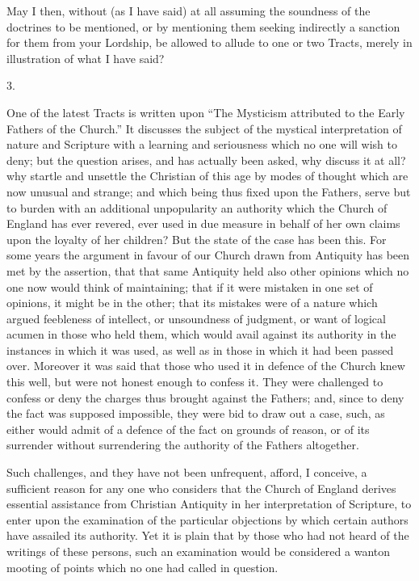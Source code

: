 May I then, without (as I have said) at all
assuming the soundness of the doctrines to be mentioned, or by
mentioning them seeking indirectly a sanction for them from your
Lordship, be allowed to allude to one or two Tracts, merely in
illustration of what I have said?

3.

One of the latest Tracts is written upon ``The
Mysticism attributed to the Early Fathers of the Church.'' It discusses
the subject of the mystical interpretation of nature and Scripture
with a learning and seriousness which no one will wish to deny; but
the question arises, and has actually been asked, why discuss it at
all? why startle and unsettle the Christian of this age by modes of
thought which are now unusual and strange; and which being thus fixed
upon the Fathers, serve but to burden with an additional unpopularity
an authority which the Church of England has ever revered, ever used
in due measure in behalf of her own claims upon the loyalty of her
children? But the state of the case has been this. For some years the
argument in favour of our Church drawn from Antiquity has been met by
the assertion, that that same Antiquity held also other opinions which
no one now would think of maintaining; that if it were mistaken in one
set of opinions, it might be in the other; that its mistakes were of a
nature which argued feebleness of intellect, or unsoundness of
judgment, or want of logical acumen in those who held them, which
would avail against its authority in the instances in which it was
used, as well as in those in which it had been passed over. Moreover
it was said that those who used it in defence of the Church knew this
well, but were not honest enough to confess it. They were challenged
to confess or deny the charges thus brought against the Fathers; and,
since to deny the fact was supposed impossible, they were bid to draw out a case, such, as either would admit of a defence of the fact
on grounds of reason, or of its surrender without surrendering the
authority of the Fathers altogether.

Such challenges, and they have not been
unfrequent, afford, I conceive, a sufficient reason for any one who
considers that the Church of England derives essential assistance from
Christian Antiquity in her interpretation of Scripture, to enter upon
the examination of the particular objections by which certain authors
have assailed its authority. Yet it is plain that by those who had not
heard of the writings of these persons, such an examination would be
considered a wanton mooting of points which no one had called in
question.


